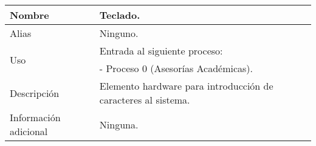 \begin{center}
  \begin{tabular}{| l | p{9cm} |}
    \hline
    Nombre & \textbf{Teclado}.\\
    \hline
    Alias & Ninguno.\\
    \hline
    \multirow{2}{*}{Uso} & Entrada al siguiente proceso:\\
                         & - Proceso 0 (Asesorías Académicas).\\
    \hline
    Descripción & Elemento hardware para introducción
                  de caracteres al sistema.\\
    \hline
    Información adicional & Ninguna.\\
    \hline
  \end{tabular}
\end{center}